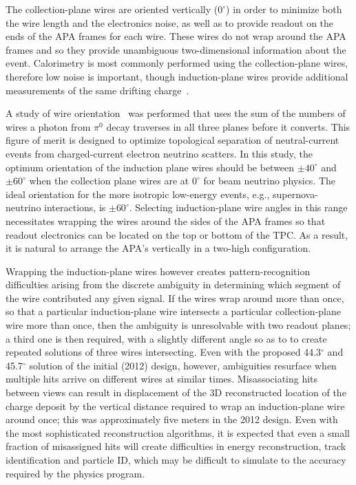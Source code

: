 The collection-plane wires are oriented vertically ($0^\circ$) in
order to minimize both the wire length and the electronics noise,
as well as to provide readout on the ends of the APA frames for
each wire.  These wires do not wrap around the APA frames and so
they provide unambiguous two-dimensional information about the
event.  Calorimetry is most commonly performed using the
collection-plane wires, therefore low noise is important, though
induction-plane wires provide additional measurements of the same
drifting charge~\cite{fd_9374, fd_8981, fd_9886}.

A study of wire orientation~\cite{docdb2836} was performed that uses
the sum of the numbers of wires a photon from $\pi^0$ decay traverses
in all three planes before it converts.  This figure of merit is
designed to optimize topological separation of neutral-current events
from charged-current electron neutrino scatters.  In this study, the
optimum orientation of the induction plane wires should be between
$\pm40^\circ$ and $\pm60^\circ$ when the collection plane wires are at
$0^\circ$ for beam neutrino physics. The ideal orientation for the
more isotropic low-energy events, e.g., supernova-neutrino
interactions, is $\pm60^\circ$.  Selecting induction-plane wire angles
in this range necessitates wrapping the wires around the sides of the
APA frames so that readout electronics can be located on the top or
bottom of the TPC.  As a result, it is natural to arrange the APA's
vertically in a two-high configuration.

Wrapping the induction-plane wires however creates pattern-recognition
difficulties arising from the discrete ambiguity in determining which segment of
the wire contributed any given signal.  If the wires wrap around more
than once, so that a particular induction-plane wire intersects a
particular collection-plane wire more than once, then the ambiguity is
unresolvable with two readout planes; a third one is then required, with
a slightly different angle so as to to create repeated solutions of
three wires intersecting.  Even with the proposed 44.3$^\circ$ and
45.7$^\circ$ solution of the initial (2012) design, however, ambiguities
resurface when multiple hits arrive on different wires at similar
times.  Misassociating hits between views can result in 
displacement of the 3D reconstructed location of the charge
deposit by the vertical distance required to wrap an induction-plane
wire around once; this was approximately five meters in the 2012 design.
Even with the most sophisticated reconstruction algorithms, it is
expected that even a small fraction of misassigned hits will create
difficulties in energy reconstruction, track identification and
particle ID, which may be difficult to simulate to the accuracy
required by the physics program.

